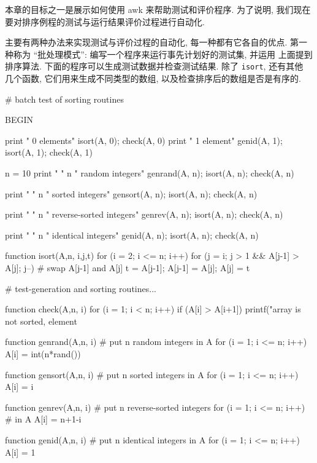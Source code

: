 本章的目标之一是展示如何使用 awk 来帮助测试和评价程序. 为了说明, 我们现在
要对排序例程的测试与运行结果评价过程进行自动化.

主要有两种办法来实现测试与评价过程的自动化, 每一种都有它各自的优点. 第一 
种称为 ``批处理模式'': 编写一个程序来运行事先计划好的测试集, 并运用
上面提到排序算法.
下面的程序可以生成测试数据并检查测试结果. 除了 \texttt{isort}, 还有其他
几个函数, 它们用来生成不同类型的数组, 以及检查排序后的数组是否是有序的.
\begin{awkcode}
    # batch test of sorting routines

    BEGIN {
        print "    0 elements"
        isort(A, 0); check(A, 0)
        print "    1 element"
        genid(A, 1); isort(A, 1); check(A, 1)
    
        n = 10
        print "    " n " random integers"
        genrand(A, n); isort(A, n); check(A, n)
    
        print "    " n " sorted integers"
        gensort(A, n); isort(A, n); check(A, n)
    
        print "    " n " reverse-sorted integers"
        genrev(A, n); isort(A, n); check(A, n)
    
        print "    " n " identical integers"
        genid(A, n); isort(A, n); check(A, n)
    }

    function isort(A,n,     i,j,t) {
        for (i = 2; i <= n; i++)
            for (j = i; j > 1 && A[j-1] > A[j]; j--) {
                # swap A[j-1] and A[j]
                t = A[j-1]; A[j-1] = A[j]; A[j] = t
            }
    }

\end{awkcode}
\begin{awkcode}
    # test-generation and sorting routines...

    function check(A,n,   i) {
        for (i = 1; i < n; i++)
            if (A[i] > A[i+1])
                printf("array is not sorted, element %
    }

    function genrand(A,n,  i) { # put n random integers in A
        for (i = 1; i <= n; i++)
            A[i] = int(n*rand())
    }

    function gensort(A,n,  i) { # put n sorted integers in A
        for (i = 1; i <= n; i++)
            A[i] = i
    }

    function genrev(A,n,  i) {  # put n reverse-sorted integers
        for (i = 1; i <= n; i++)  # in A
            A[i] = n+1-i
    }

    function genid(A,n,  i) {   # put n identical integers in A
        for (i = 1; i <= n; i++)
            A[i] = 1
    }
\end{awkcode}

